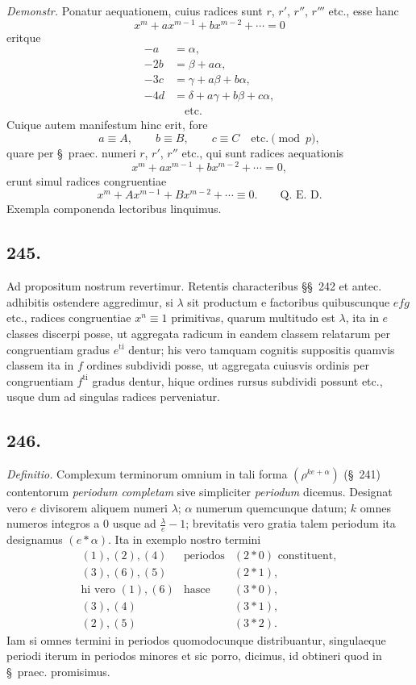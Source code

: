 \documentclass[12pt]{article}
\begin{document}
\textit{Demonstr.} Ponatur aequationem, cuius radices sunt $r$, $r'$, $r''$, $r'''$ etc., esse hanc
\[
x^m+a x^{m-1}+b x^{m-2}+\cdots=0
\]
eritque
\[
\begin{aligned}
-a&=\alpha,\\
-2b&=\beta+a\alpha,\\
-3c&=\gamma+a\beta+b\alpha,\\
-4d&=\delta+a\gamma+b\beta+c\alpha,\\
&\quad\text{etc.}
\end{aligned}
\]
Cuique autem manifestum hinc erit, fore
\[
a\equiv A,\qquad b\equiv B,\qquad c\equiv C\quad \text{etc.}\pmod p,
\]
quare per \S~praec. numeri $r$, $r'$, $r''$ etc., qui sunt radices aequationis
\[
x^m+a x^{m-1}+b x^{m-2}+\cdots=0,
\]
erunt simul radices congruentiae
\[
x^m+A x^{m-1}+B x^{m-2}+\cdots\equiv 0. \qquad \text{Q. E. D.}
\]
Exempla componenda lectoribus linquimus.

\subsection*{245.}
Ad propositum nostrum revertimur. Retentis characteribus \S\S~242 et antec. adhibitis ostendere aggredimur, si $\lambda$ sit productum e factoribus quibuscunque $efg$ etc., radices congruentiae $x^n\equiv 1$ primitivas, quarum multitudo est $\lambda$, ita in $e$ classes discerpi posse, ut aggregata radicum in eandem classem relatarum per congruentiam gradus $e^{\mathrm{ti}}$ dentur; his vero tamquam cognitis suppositis quamvis classem ita in $f$ ordines subdividi posse, ut aggregata cuiusvis ordinis per congruentiam $f^{\mathrm{ti}}$ gradus dentur, hique ordines rursus subdividi possunt etc., usque dum ad singulas radices perveniatur.

\subsection*{246.}
\textit{Definitio.} Complexum terminorum omnium in tali forma $(\rho^{ke+\alpha})$ (\S~241) contentorum \textit{periodum completam} sive simpliciter \textit{periodum} dicemus. Designat vero $e$ divisorem aliquem numeri $\lambda$; $\alpha$ numerum quemcunque datum; $k$ omnes numeros integros a $0$ usque ad $\frac{\lambda}{e}-1$; brevitatis vero gratia talem periodum ita designamus $(e*\alpha)$. Ita in exemplo nostro termini
\[
\begin{array}{rcl}
(1),(2),(4)&\text{periodos}&(2*0)\text{ constituent},\\
(3),(6),(5)&& (2*1),\\[2pt]
\text{hi vero }(1),(6)&\text{hasce}&(3*0),\\
(3),(4)&& (3*1),\\
(2),(5)&& (3*2).
\end{array}
\]
Iam si omnes termini in periodos quomodocunque distribuantur, singulaeque periodi iterum in periodos minores et sic porro, dicimus, id obtineri quod in \S~praec. promisimus.
\end{document}
